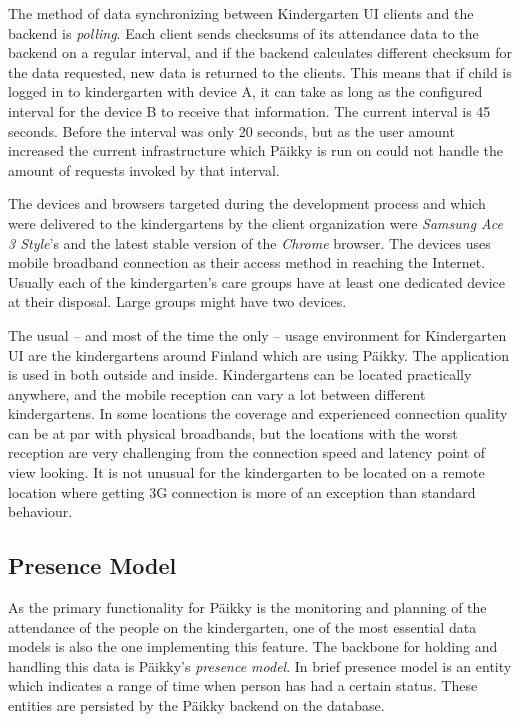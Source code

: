 The method of data synchronizing between Kindergarten UI clients and the backend is \textit{polling}. Each client sends checksums of its attendance data to the backend on a regular interval, and if the backend calculates different checksum for the data requested, new data is returned to the clients. This means that if child is logged in to kindergarten with device A, it can take as long as the configured interval for the device B to receive that information. The current interval is 45 seconds. Before the interval was only 20 seconds, but as the user amount increased the current infrastructure which Päikky is run on could not handle the amount of requests invoked by that interval. 

The devices and browsers targeted during the development process and which  were delivered to the kindergartens by the client organization were \textit{Samsung Ace 3 Style}'s and the latest stable version of the \textit{Chrome} browser. The devices uses mobile broadband connection as their access method in reaching the Internet. Usually each of the kindergarten's care groups have at least one dedicated device at their disposal. Large groups might have two devices. 

The usual – and most of the time the only – usage environment for Kindergarten UI are the kindergartens around Finland which are using Päikky. The application is used in both outside and inside. Kindergartens can be located practically anywhere, and the mobile reception can vary a lot between different kindergartens. In some locations the coverage and experienced connection quality can be at par with physical broadbands, but the locations with the worst reception are very challenging from the connection speed and latency point of view looking. It is not unusual for the kindergarten to be located on a remote location where getting 3G connection is more of an exception than standard behaviour. %


\subsection{Presence Model}


As the primary functionality for Päikky is the monitoring and planning of the attendance of the people on the kindergarten, one of the most essential data models is also the one implementing this feature. The backbone for holding and handling this data is Päikky's \textit{presence model}. In brief presence model is an entity which indicates a range of time when person has had a certain status. These entities are persisted by the Päikky backend on the database.

